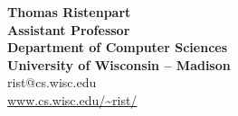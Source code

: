 \documentclass[10pt]{article}
\newcommand{\secsep}{\vspace*{1.50em}}
\begin{document}

\begin{center}
\textbf{\Large{Thomas Ristenpart}}\\\smallskip
\textbf{Assistant Professor}\\
\textbf{Department of Computer Sciences}\\
\textbf{University of Wisconsin -- Madison}\\
 {rist@cs.wisc.edu} \\
 {\url{www.cs.wisc.edu/~rist/}}  
\end{center}
\vspace*{-1.5em}

\noindent\hrulefill
\\



\end{document}
